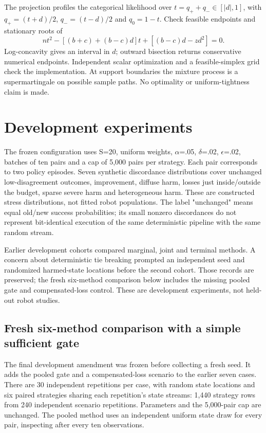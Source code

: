 \documentclass[conference]{IEEEtran}
\begin{document}
The projection profiles the categorical likelihood over
$t=q_++q_-\in[|d|,1]$, with $q_+=(t+d)/2$, $q_-=(t-d)/2$ and $q_0=1-t$.
Check feasible endpoints and stationary roots of
\begin{equation}
nt^2-[(b+c)+(b-c)d]t+[(b-c)d-zd^2]=0.
\end{equation}
Log-concavity gives an interval in $d$; outward bisection returns
conservative numerical endpoints. Independent scalar optimization and
a feasible-simplex grid check the implementation. At support boundaries
the mixture process is a supermartingale on possible sample paths.
No optimality or uniform-tightness claim is made.

\section{Development experiments}

The frozen configuration uses S=20, uniform weights, $\alpha$=.05, $\delta$=.02, $\epsilon$=.02, batches of ten pairs and a cap of 5,000 pairs per strategy. Each pair corresponds to two policy episodes. Seven synthetic discordance distributions cover unchanged low-disagreement outcomes, improvement, diffuse harm, losses just inside/outside the budget, sparse severe harm and heterogeneous harm. These are constructed stress distributions, not fitted robot populations. The label "unchanged" means equal old/new success probabilities; its small nonzero discordances do not represent bit-identical execution of the same deterministic pipeline with the same random stream.

Earlier development cohorts compared marginal, joint and terminal methods. A concern about deterministic tie breaking prompted an independent seed and randomized harmed-state locations before the second cohort. Those records are preserved; the fresh six-method comparison below includes the missing pooled gate and compensated-loss control. These are development experiments, not held-out robot studies.

\subsection{Fresh six-method comparison with a simple sufficient gate}

The final development amendment was frozen before collecting a fresh seed. It adds the pooled gate and a compensated-loss scenario to the earlier seven cases. There are 30 independent repetitions per case, with random state locations and six paired strategies sharing each repetition's state streams: 1,440 strategy rows from 240 independent scenario repetitions. Parameters and the 5,000-pair cap are unchanged. The pooled method uses an independent uniform state draw for every pair, inspecting after every ten observations.
\end{document}
